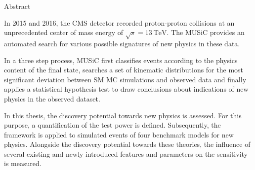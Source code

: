 
{Abstract}
\chapterheadendvskip

In 2015 and 2016, the \acs{CMS} detector recorded proton-proton collisions at an unprecedented center of mass energy of $\sqrt{s} = \SI{13}{\TeV}$. The \acf{MUSiC} provides an automated search for various possible signatures of new physics in these data.

In a three step process, \acs{MUSiC} first classifies events according to the physics content of the final state, searches a set of kinematic distributions for the most significant deviation between \acl{SM} \acl{MC} simulations and observed data and finally applies a statistical hypothesis test to draw conclusions about indications of new physics in the observed dataset.

In this thesis, the discovery potential towards new physics is assessed. For this purpose, a quantification of the test power is defined. Subsequently, the framework is applied to simulated events of four benchmark models for new physics. Alongside the discovery potential towards these theories, the influence of several existing and newly introduced features and parameters on the sensitivity is measured.
